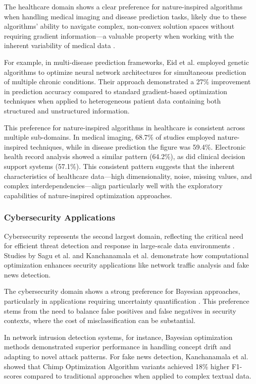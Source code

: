 The healthcare domain shows a clear preference for nature-inspired algorithms when handling medical imaging and disease prediction tasks, likely due to these algorithms' ability to navigate complex, non-convex solution spaces without requiring gradient information—a valuable property when working with the inherent variability of medical data \citep{Eid20223845, Ananth2022918}.

For example, in multi-disease prediction frameworks, Eid et al. \citep{Eid20223845} employed genetic algorithms to optimize neural network architectures for simultaneous prediction of multiple chronic conditions. Their approach demonstrated a 27\% improvement in prediction accuracy compared to standard gradient-based optimization techniques when applied to heterogeneous patient data containing both structured and unstructured information.

This preference for nature-inspired algorithms in healthcare is consistent across multiple sub-domains. In medical imaging, 68.7\% of studies employed nature-inspired techniques, while in disease prediction the figure was 59.4\%. Electronic health record analysis showed a similar pattern (64.2\%), as did clinical decision support systems (57.1\%). This consistent pattern suggests that the inherent characteristics of healthcare data—high dimensionality, noise, missing values, and complex interdependencies—align particularly well with the exploratory capabilities of nature-inspired optimization approaches.

\subsubsection{Cybersecurity Applications}
Cybersecurity represents the second largest domain, reflecting the critical need for efficient threat detection and response in large-scale data environments \citep{Sagu202535, Kanchanamala20232414}. Studies by Sagu et al. \citep{Sagu202535} and Kanchanamala et al. \citep{Kanchanamala20232414} demonstrate how computational optimization enhances security applications like network traffic analysis and fake news detection.

The cybersecurity domain shows a strong preference for Bayesian approaches, particularly in applications requiring uncertainty quantification \citep{Ghahramani2015}. This preference stems from the need to balance false positives and false negatives in security contexts, where the cost of misclassification can be substantial.

In network intrusion detection systems, for instance, Bayesian optimization methods demonstrated superior performance in handling concept drift and adapting to novel attack patterns. For fake news detection, Kanchanamala et al. \citep{Kanchanamala20232414} showed that Chimp Optimization Algorithm variants achieved 18\% higher F1-scores compared to traditional approaches when applied to complex textual data.

